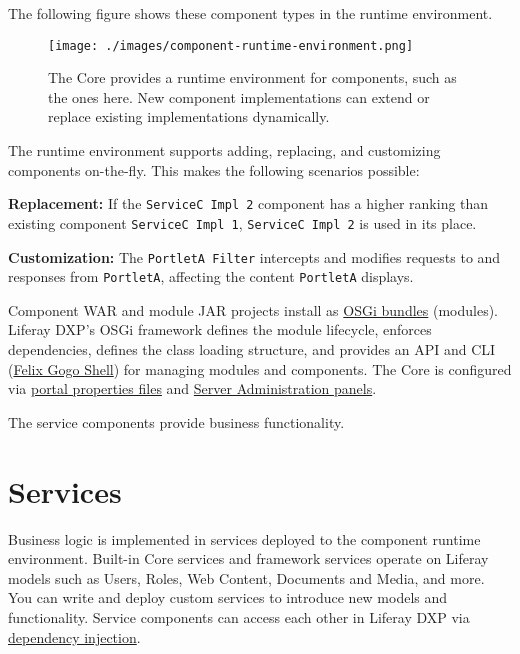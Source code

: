 The following figure shows these component types in the runtime
environment.

\begin{figure}
\centering
\texttt{[image: ./images/component-runtime-environment.png]}
\caption{The Core provides a runtime environment for components, such as
the ones here. New component implementations can extend or replace
existing implementations dynamically.}
\end{figure}

The runtime environment supports adding, replacing, and customizing
components on-the-fly. This makes the following scenarios possible:

\textbf{Replacement:} If the \texttt{ServiceC\ Impl\ 2} component has a
higher ranking than existing component \texttt{ServiceC\ Impl\ 1},
\texttt{ServiceC\ Impl\ 2} is used in its place.

\textbf{Customization:} The \texttt{PortletA\ Filter} intercepts and
modifies requests to and responses from \texttt{PortletA}, affecting the
content \texttt{PortletA} displays.

Component WAR and module JAR projects install as
\href{https://www.osgi.org/}{OSGi bundles} (modules). Liferay DXP's OSGi
framework defines the module lifecycle, enforces dependencies, defines
the class loading structure, and provides an API and CLI
(\href{/docs/7-2/customization/-/knowledge_base/c/using-the-felix-gogo-shell}{Felix
Gogo Shell}) for managing modules and components. The Core is configured
via \href{/docs/7-2/deploy/-/knowledge_base/d/portal-properties}{portal
properties files} and
\href{/docs/7-2/user/-/knowledge_base/u/server-administration}{Server
Administration panels}.

The service components provide business functionality.

\section{Services}\label{services}

Business logic is implemented in services deployed to the component
runtime environment. Built-in Core services and framework services
operate on Liferay models such as Users, Roles, Web Content, Documents
and Media, and more. You can write and deploy custom services to
introduce new models and functionality. Service components can access
each other in Liferay DXP via
\href{/docs/7-2/frameworks/-/knowledge_base/f/declarative-services}{dependency
injection}.

